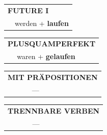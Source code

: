 \documentclass[10pt,a4paper]{revtex4-2}
\begin{document}
\begin{verbbox}
\begin{tabular}{rl}
    \multicolumn{2}{l}{\textbf{FUTURE I} }\\
  &  werden + \textbf{laufen}\\
 
  \end{tabular}
\hfill
   \begin{tabular}{rl}
      \multicolumn{2}{l}{\textbf{PLUSQUAMPERFEKT}}\\
  &  waren + \textbf{gelaufen}\\
  \end{tabular}
  
  \vspace{10pt}



\begin{tabular}{lll}
\multicolumn{3}{l}{\textbf{MIT PRÄPOSITIONEN}}\\
& ---\\
\end{tabular}
\hfill
\begin{tabular}{lll}
\multicolumn{3}{l}{\textbf{TRENNBARE VERBEN}}\\
& ---\\
\end{tabular}
  
\vspace{-5pt}


\end{verbbox}
\end{document}
